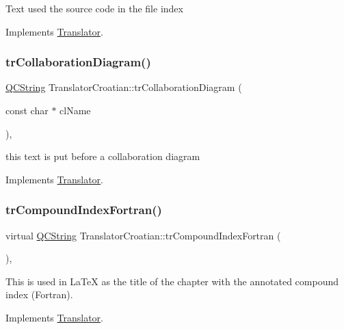 Text used the source code in the file index 

Implements \mbox{\hyperlink{class_translator}{Translator}}.

\mbox{\label{class_translator_croatian_a219aae35a34f8cbb2360f975b587e15f}} 
\subsubsection{\texorpdfstring{trCollaborationDiagram()}{trCollaborationDiagram()}}
{\footnotesize\ttfamily \mbox{\hyperlink{class_q_c_string}{Q\+C\+String}} Translator\+Croatian\+::tr\+Collaboration\+Diagram (\begin{DoxyParamCaption}\item[{const char $\ast$}]{cl\+Name }\end{DoxyParamCaption})\hspace{0.3cm}{\ttfamily [inline]}, {\ttfamily [virtual]}}

this text is put before a collaboration diagram 

Implements \mbox{\hyperlink{class_translator}{Translator}}.

\mbox{\label{class_translator_croatian_a72bacf57e2216baa5c7952f805b68003}} 
\subsubsection{\texorpdfstring{trCompoundIndexFortran()}{trCompoundIndexFortran()}}
{\footnotesize\ttfamily virtual \mbox{\hyperlink{class_q_c_string}{Q\+C\+String}} Translator\+Croatian\+::tr\+Compound\+Index\+Fortran (\begin{DoxyParamCaption}{ }\end{DoxyParamCaption})\hspace{0.3cm}{\ttfamily [inline]}, {\ttfamily [virtual]}}

This is used in La\+TeX as the title of the chapter with the annotated compound index (Fortran). 

Implements \mbox{\hyperlink{class_translator}{Translator}}.

